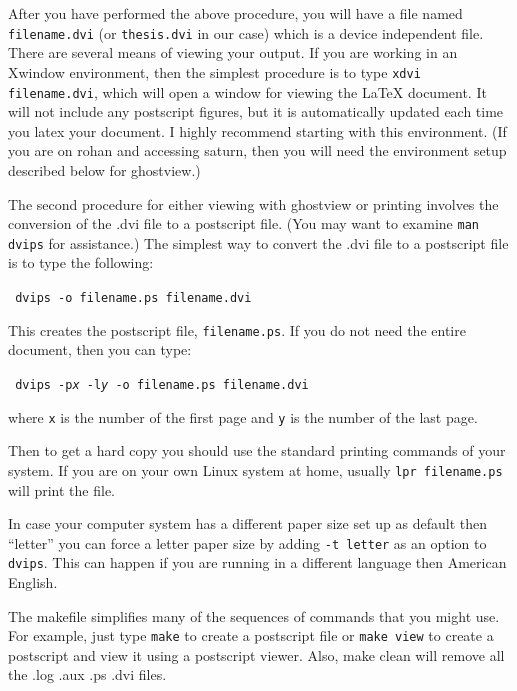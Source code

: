 After you have performed the above procedure, you will have a file
named \texttt{filename.dvi} (or \texttt{thesis.dvi} in our case) which
is a device independent file. There are several means of viewing your
output. If you are working in an Xwindow environment, then the
simplest procedure is to type \texttt{xdvi filename.dvi}, which will
open a window for viewing the \LaTeX{} document. It will not include
any postscript figures, but it is automatically updated each time you
latex your document. I highly recommend starting with this
environment. (If you are on rohan and accessing saturn, then you will
need the environment setup described below for ghostview.)

The second procedure for either viewing with ghostview or printing
involves the conversion of the .dvi file to a postscript file. (You
may want to examine \texttt{man dvips} for assistance.) The simplest
way to convert the .dvi file to a postscript file is to type the
following: \vspace{.15in}

\texttt{
  dvips -o filename.ps filename.dvi
}
\vspace{.15in}

\noindent
This creates the postscript file, \texttt{filename.ps}. If you do not
need the entire document, then you can type: \vspace{.15in}

\texttt{
  dvips -p\emph{x} -l\emph{y} -o filename.ps filename.dvi
}
\vspace{.15in}

\noindent
where \texttt{x} is the number of the first page and \texttt{y} is the
number of the last page.

Then to get a hard copy you should use the standard printing commands
of your system.  If you are on your own Linux system at home, usually
\texttt{lpr filename.ps} will print the file.

In case your computer system has a different paper size set up as
default then ``letter'' you can force a letter paper size by adding
\texttt{-t letter} as an option to \texttt{dvips}.  This can happen if
you are running in a different language then American English.

The makefile simplifies many of the sequences of commands that you
might use.  For example, just type \texttt{make} to create a
postscript file or \texttt{make view} to create a postscript and view
it using a postscript viewer. Also, make clean will remove all the
.log .aux .ps .dvi files.


